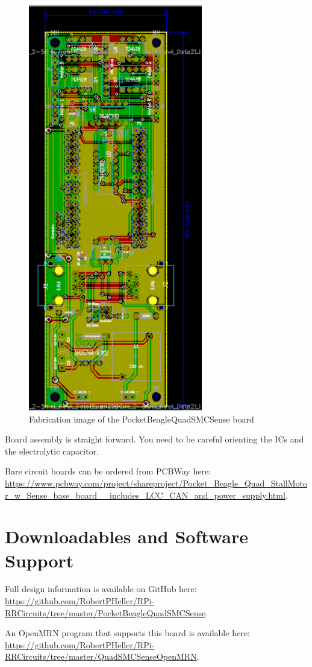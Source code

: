 \begin{figure}[hbpt]\begin{centering}%
\includegraphics[height=7in]{PocketBeagleQuadSMCSense.png}
\caption{Fabrication image of the PocketBeagleQuadSMCSense board}
\end{centering}\end{figure}
Board assembly is straight forward. You need to be careful orienting the ICs
and the electrolytic capacitor.

Bare circuit boards can be ordered from PCBWay here: 
\url{https://www.pcbway.com/project/shareproject/Pocket\_Beagle\_Quad\_StallMotor\_w\_Sense\_base\_board\_\_includes\_LCC\_CAN\_and\_power\_supply.html}.

\section{Downloadables and Software Support}

Full design information is available on GitHub here:
\url{https://github.com/RobertPHeller/RPi-RRCircuits/tree/master/PocketBeagleQuadSMCSense}.

An OpenMRN program that supports this board is available here:
\url{https://github.com/RobertPHeller/RPi-RRCircuits/tree/master/QuadSMCSenseOpenMRN}.



